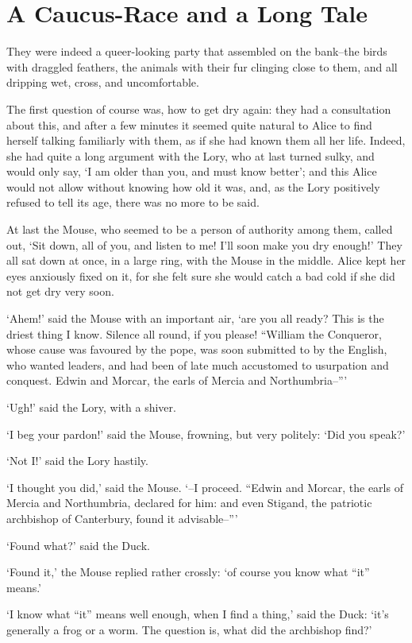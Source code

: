 \documentclass[statementpaper,twoside,openany]{memoir}
\begin{document}
\chapter{A Caucus-Race and a Long Tale}

They were indeed a queer-looking party that assembled on the bank--the birds with draggled feathers, the animals with their fur clinging close to them, and all dripping wet, cross, and uncomfortable.

The first question of course was, how to get dry again: they had a consultation about this, and after a few minutes it seemed quite natural to Alice to find herself talking familiarly with them, as if she had known them all her life. Indeed, she had quite a long argument with the Lory, who at last turned sulky, and would only say, `I am older than you, and must know better'; and this Alice would not allow without knowing how old it was, and, as the Lory positively refused to tell its age, there was no more to be said.

At last the Mouse, who seemed to be a person of authority among them, called out, `Sit down, all of you, and listen to me! I'll soon make you dry enough!' They all sat down at once, in a large ring, with the Mouse in the middle. Alice kept her eyes anxiously fixed on it, for she felt sure she would catch a bad cold if she did not get dry very soon.

`Ahem!' said the Mouse with an important air, `are you all ready? This is the driest thing I know. Silence all round, if you please! ``William the Conqueror, whose cause was favoured by the pope, was soon submitted to by the English, who wanted leaders, and had been of late much accustomed to usurpation and conquest. Edwin and Morcar, the earls of Mercia and Northumbria--'''

`Ugh!' said the Lory, with a shiver.

`I beg your pardon!' said the Mouse, frowning, but very politely: `Did you speak?'

`Not I!' said the Lory hastily.

`I thought you did,' said the Mouse. `--I proceed. ``Edwin and Morcar, the earls of Mercia and Northumbria, declared for him: and even Stigand, the patriotic archbishop of Canterbury, found it advisable--'''

`Found what?' said the Duck.

`Found it,' the Mouse replied rather crossly: `of course you know what ``it'' means.'

`I know what ``it'' means well enough, when I find a thing,' said the Duck: `it's generally a frog or a worm. The question is, what did the archbishop find?'
\end{document}
